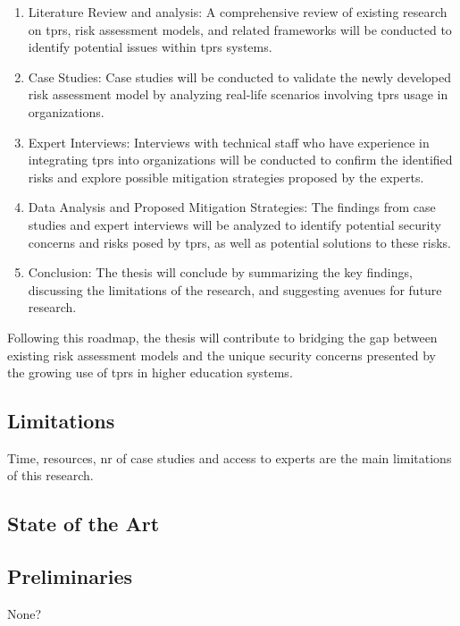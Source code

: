 \begin{enumerate}
  \item Literature Review and analysis: A comprehensive review of existing research on \ac{tprs}, risk assessment models, and related
  frameworks will be conducted to identify potential issues within \ac{tprs} systems.
  \item Case Studies: Case studies will be conducted to validate the newly developed risk assessment model by analyzing real-life scenarios involving \ac{tprs} usage in organizations.
  \item Expert Interviews: Interviews with technical staff who have experience in integrating \ac{tprs} into organizations will be conducted to confirm the identified risks and explore possible mitigation strategies proposed by the experts.
  \item Data Analysis and Proposed Mitigation Strategies: The findings from case studies and expert interviews will be analyzed to identify potential security concerns and risks posed by \ac{tprs}, as well as potential solutions to these risks.
  \item Conclusion: The thesis will conclude by summarizing the key findings, discussing the limitations of the research, and suggesting avenues for future research.
\end{enumerate}
Following this roadmap, the thesis will contribute to bridging the gap between existing risk assessment models and the unique security concerns presented by the growing use of \ac{tprs} in higher education systems.

\subsection{Limitations}


Time, resources, nr of case studies and access to experts are the main limitations of this research.

\subsection{State of the Art}


\subsection{Preliminaries}

None?

